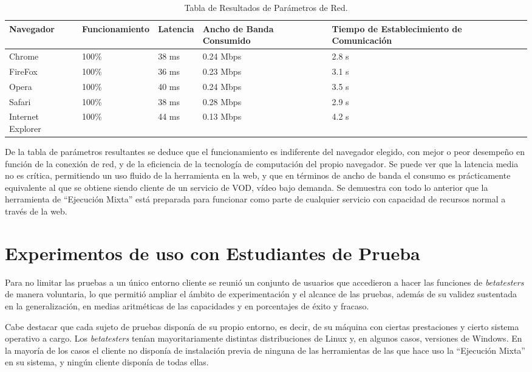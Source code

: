 \begin{table}[htbp]
\begin{center}
\begin{tabular}{| p{1.8cm}| p{2.6cm} | p{1.7cm}| p{2.4cm}| p{3cm}|}
\hline
Navegador & Funcionamiento & Latencia & Ancho de Banda Consumido & Tiempo de Establecimiento de Comunicación \\
\hline \hline
Chrome & 100\% & 38 ms & 0.24 Mbps & 2.8 s\\ \hline
FireFox & 100\% & 36 ms & 0.23 Mbps & 3.1 s\\ \hline
Opera & 100\% & 40 ms & 0.24 Mbps & 3.5 s\\ \hline
Safari & 100\% & 38 ms & 0.28 Mbps & 2.9 s\\ \hline
Internet Explorer & 100\% & 44 ms & 0.13 Mbps & 4.2 s\\ \hline
\end{tabular}
\caption{Tabla de Resultados de Parámetros de Red.}
\label{tabla:pros_cons}
\end{center}
\end{table}

De la tabla de parámetros resultantes se deduce que el funcionamiento es indiferente del navegador elegido, con mejor o peor desempeño en función de la conexión de red, y de la eficiencia de la tecnología de computación del propio navegador. Se puede ver que la latencia media no es crítica, permitiendo un uso fluido de la herramienta en la web, y que en términos de ancho de banda el consumo es prácticamente equivalente al que se obtiene siendo cliente de un servicio de VOD, vídeo bajo demanda. Se demuestra con todo lo anterior que la herramienta de ``Ejecución Mixta'' está preparada para funcionar como parte de cualquier servicio con capacidad de recursos normal a través de la web.

\section{Experimentos de uso con Estudiantes de Prueba}

Para no limitar las pruebas a un único entorno cliente se reunió un conjunto de usuarios que accedieron a hacer las funciones de \textit{betatesters} de manera voluntaria, lo que permitió ampliar el ámbito de experimentación y el alcance de las pruebas, además de su validez sustentada en la generalización, en medias aritméticas de las capacidades y en porcentajes de éxito y fracaso.

Cabe destacar que cada sujeto de pruebas disponía de su propio entorno, es decir, de su máquina con ciertas prestaciones y cierto sistema operativo a cargo. Los \textit{betatesters} tenían mayoritariamente distintas distribuciones de Linux y, en algunos casos, versiones de Windows. En la mayoría de los casos el cliente no disponía de instalación previa de ninguna de las herramientas de las que hace uso la ``Ejecución Mixta'' en su sistema, y ningún cliente disponía de todas ellas.


